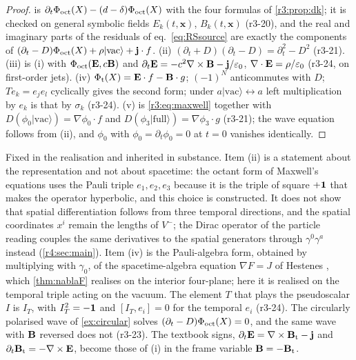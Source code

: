 \begin{proof}
 is $\partial_t\Phi_{\rm oct}(X)-(d-\delta)\Phi_{\rm oct}(X)$ with the four formulas of \cref{r3:prop:dk}; it is checked on general symbolic fields
$E_k(t,\mathbf x)$, $B_k(t,\mathbf x)$ (r3-20), and the real and imaginary parts of the residuals of eq.~\cref{eq:RSsource} are exactly the
components of $(\partial_t-D)\Phi_{\rm oct}(X)+\rho|\mathrm{vac}\rangle+\mathbf j\cdot f$. (ii) $(\partial_t+D)(\partial_t-D)=\partial_t^2-D^2$ (r3-21). (iii) is (i) with $\Phi_{\rm oct}(\mathbf E,c\mathbf B)$ and
$\partial_t\mathbf E=-c^2\nabla\times\mathbf B-\mathbf j/\varepsilon_0$, $\nabla\cdot\mathbf E=\rho/\varepsilon_0$ (r3-24, on first-order jets). (iv) $\Phi_{\rm t}(X)=\mathbf E\cdot f-\mathbf B\cdot g$; $(-1)^N$
anticommutes with $D$; $Te_k=e_je_l$ cyclically gives the second form; under $a|\mathrm{vac}\rangle\leftrightarrow a$ left multiplication by $e_k$ is that by $\sigma_k$ (r3-24). (v) is
\cref{r3:eq:maxwell} together with $D(\phi_0|\mathrm{vac}\rangle)=\nabla\phi_0\cdot f$ and $D(\phi_3|\mathrm{full}\rangle)=\nabla\phi_3\cdot g$ (r3-21); the wave equation follows from (ii), and
$\phi_0$ with $\phi_0=\partial_t\phi_0=0$ at $t=0$ vanishes identically.
\end{proof}

Fixed in the realisation and inherited in substance. Item (ii) is a statement about the representation and not about spacetime: the
octant form of Maxwell's equations uses the Pauli triple $e_1,e_2,e_3$ because it is the triple of square $+\mathbf 1$ that makes the operator hyperbolic,
and this choice is constructed. It does not show that spatial differentiation follows from three temporal directions, and the spatial
coordinates $x^i$ remain the lengths of $V^-$; the Dirac operator of the particle reading couples the same derivatives to the spatial
generators through $\gamma^0\gamma^a$ instead (\cref{r4:sec:main}). Item (iv) is the Pauli-algebra form, obtained by multiplying with $\gamma_0$, of the
spacetime-algebra equation $\nabla F=J$ of Hestenes \cite{Hestenes66}, which \cref{thm:nablaF} realises on the interior four-plane; here
it is realised on the temporal triple acting on the vacuum. The element $T$ that plays the pseudoscalar $I$ is $I_T$,
with $I_T^2=-\mathbf 1$ and $[I_T,e_i]=0$ for the temporal $e_i$ (r3-24). The circularly polarised wave of \cref{ex:circular} solves $(\partial_t-D)\Phi_{\rm oct}(X)=0$, and the same wave with $\mathbf B$ reversed does
not (r3-23). The textbook signs, $\partial_t\mathbf E=\nabla\times\mathbf B_{\rm t}-\mathbf j$ and $\partial_t\mathbf B_{\rm t}=-\nabla\times\mathbf E$, become those of (i) in the frame
variable $\mathbf B=-\mathbf B_{\rm t}$.

